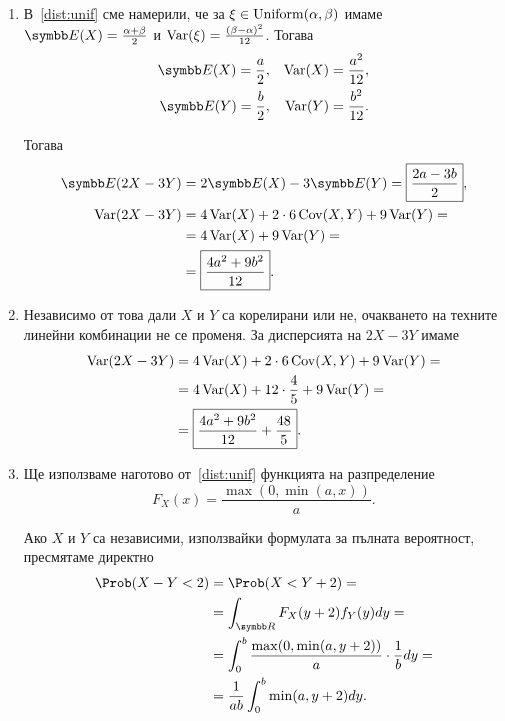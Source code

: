 \documentclass[numbers=endperiod, bibliography=totocnumbered]{scrartcl}
\begin{document}
\begin{solution}
  \mbox{}
  \begin{enumerate}[label=\alph*)]
    \item В~\ref{dist:unif} сме намерили, че за \( \xi \in \operatorname{Uniform}(\alpha, \beta) \) имаме \( \Expect(X) = \frac {\alpha + \beta} 2 \) и \( \operatorname{Var}(\xi) = \frac {{(\beta - \alpha)}^2} {12} \). Тогава
    \begin{align*}
      \Expect(X) = \frac a 2,
      &&
      \Var(X) = \frac {a^2} {12},
      \\
      \Expect(Y) = \frac b 2,
      &&
      \Var(Y) = \frac {b^2} {12}.
    \end{align*}

    Тогава
    \begin{align*}
      \Expect(2X - 3Y)
      &=
      2\Expect(X) - 3\Expect(Y)
      =
      \boxed{\frac {2a - 3b} 2},
      \\
      \Var(2X - 3Y)
      &=
      4\Var(X) + 2 \cdot 6 \Cov(X, Y) + 9\Var(Y)
      = \\ &=
      4\Var(X) + 9\Var(Y)
      = \\ &=
      \boxed{\frac {4a^2 + 9b^2} {12}}.
    \end{align*}

    \item Независимо от това дали \( X \) и \( Y \) са корелирани или не, очакването на техните линейни комбинации не се променя. За дисперсията на \( 2X - 3Y \) имаме
    \begin{align*}
      \operatorname{Var}(2X - 3Y)
      &=
      4\operatorname{Var}(X) + 2 \cdot 6 \operatorname{Cov}(X, Y) + 9\operatorname{Var}(Y)
      = \\ &=
      4\operatorname{Var}(X) + 12 \cdot \frac 4 5 + 9\operatorname{Var}(Y)
      = \\ &=
      \boxed{\frac {4a^2 + 9b^2} {12} + \frac {48} 5}.
    \end{align*}

    \item Ще използваме наготово от~\ref{dist:unif} функцията на разпределение
    \begin{equation*}
      F_X(x) = \frac {\max(0, \min(a, x))} a.
    \end{equation*}

     Ако \( X \) и \( Y \) са независими, използвайки формулата за пълната вероятност, пресмятаме директно
    \begin{align*}
      \Prob(X - Y < 2)
      &=
      \Prob(X < Y + 2)
      = \\ &=
      \int_{\R} F_X(y+2) f_Y(y) dy
      = \\ &=
      \int_0^b \frac {\max(0, \min(a, y+2))} a \cdot \frac 1 b dy
      = \\ &=
      \frac 1 {ab} \int_0^b \min(a, y+2) dy.
    \end{align*}


\end{enumerate}
\end{solution}
\end{document}
